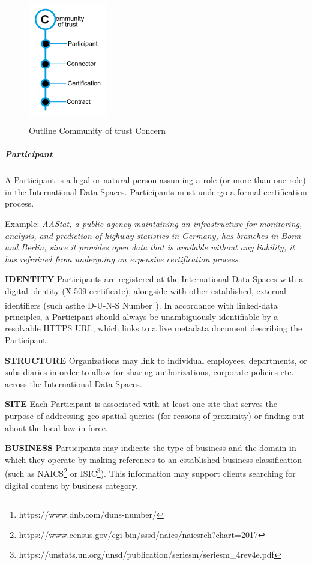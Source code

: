 \begin{figure}[H]
	\begin{Center}
		\includegraphics[width=1.36in,height=2.12in]{./media/image48.png}
		\caption{Outline Community of trust Concern}
		\label{fig:community_of_trust_concern}
	\end{Center}
\end{figure}


\subparagraph*{Participant}
A Participant is a legal or natural person assuming a role (or more than one role) in the International Data Spaces. Participants must undergo a formal certification process.  

Example: \textit{AAStat, a public agency maintaining an infrastructure for monitoring, analysis, and prediction of highway statistics in Germany, has branches in Bonn and Berlin; since it provides open data that is available without any liability, it has refrained from undergoing an expensive certification process}.

\textbf{IDENTITY} Participants are registered at the International Data Spaces with a digital identity (X.509 certificate), alongside with other established, external identifiers (such asthe D-U-N-S Number\footnote{https://www.dnb.com/duns-number/ }). In accordance with linked-data principles, a Participant should always be unambiguously identifiable by a resolvable HTTPS URL, which links to a live metadata document describing the Participant.

\textbf{STRUCTURE} Organizations may link to individual employees, departments, or subsidiaries in order to allow for sharing authorizations, corporate policies etc. across the International Data Spaces. 

\textbf{SITE} Each Participant is associated with at least one site that serves the purpose of addressing geo-spatial queries (for reasons of proximity) or finding out about the local law in force. 

\textbf{BUSINESS} Participants may indicate the type of business and the domain in which they operate by making references to an established business classification (such as NAICS\footnote{https://www.census.gov/cgi-bin/sssd/naics/naicsrch?chart=2017 } or ISIC\footnote{https://unstats.un.org/unsd/publication/seriesm/seriesm\_4rev4e.pdf }). This information may support clients searching for digital content by business category. 

